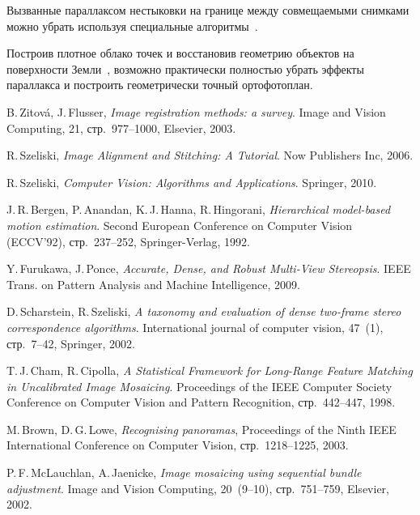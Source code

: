 \documentclass[a4paper,12pt]{article}
\begin{document}
Вызванные параллаксом нестыковки на границе между совмещаемыми снимками можно
убрать используя специальные алгоритмы~\cite{shum00mosaic, kang04mpps}.

Построив плотное облако точек и восстановив геометрию 
объектов на поверхности Земли~\cite{furu09mvs}, возможно практически полностью убрать эффекты 
параллакса и построить геометрически точный ортофотоплан.

\begin{thebibliography}{99}

  B.\,Zitov\'a, J.\,Flusser,
  \emph{Image registration methods: a survey}.
  Image and Vision Computing,
  21,
  стр.~977--1000,
  Elsevier,
  2003.
  
  R.\,Szeliski,
  \emph{Image Alignment and Stitching: A Tutorial}.
  Now Publishers Inc,
  2006.

  R.\,Szeliski,
  \emph{Computer Vision: Algorithms and Applications}.
  Springer,
  2010.

  J.\,R.\,Bergen, P.\,Anandan, K.\,J.\,Hanna, R.\,Hingorani, 
  \emph{Hierarchical model-based motion estimation}.
  Second European Conference on Computer Vision (ECCV’92), 
  стр.~237--252,
  Springer-Verlag, 
  1992.

  Y.\,Furukawa, J.\,Ponce,
  \emph{Accurate, Dense, and Robust Multi-View Stereopsis}.
  IEEE Trans. on Pattern Analysis and Machine Intelligence,
  2009.
 
  D.\,Scharstein, R.\,Szeliski,
  \emph{A taxonomy and evaluation of dense two-frame stereo correspondence algorithms}.
  International journal of computer vision,
  47~(1),
  стр.~7--42,
  Springer,
  2002.

  T.\,J.\,Cham, R.\,Cipolla,
  \emph{A Statistical Framework for Long-Range Feature Matching in Uncalibrated Image Mosaicing}.
  Proceedings of the IEEE Computer Society Conference on Computer Vision and Pattern Recognition,
  стр.~442--447,
  1998.

  M.\,Brown, D.\,G.\,Lowe,
  \emph{Recognising panoramas},
  Proceedings of the Ninth IEEE International Conference on Computer Vision,
  стр.~1218--1225,
  2003.

  P.\,F.\,McLauchlan, A.\,Jaenicke,
  \emph{Image mosaicing using sequential bundle adjustment}.
  Image and Vision Computing,
  20~(9--10),
  стр.~751--759,
  Elsevier,
  2002.


\end{thebibliography}
\end{document}
